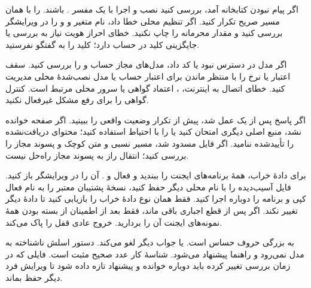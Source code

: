 اگر پیام نبودن کتابخانه آمد، بررسی کنید نصب و اجرا با یک مفسر .
 باشند. 
 را با همان مسیر صریح تکرار کنید. اگر تنظیم محلی خطا داد، نام متغیر و 
 و 
 را در ویرایشگر بررسی کنید و مقدار محرمانه را چاپ نکنید. خطای احراز هویت نیاز به بررسی یا جایگزینی کلید در حساب 
 دارد؛ کلید را به گفتگو نفرستید.

اگر مدل در دسترس نبود یا 
 کد 
 داد، مدل‌های مجاز حساب و 
 را بررسی کنید. سقف اعتبار یا نرخ را با منتظر ماندن برای اعتبار حساب یا مدل نصب‌شدهٔ محلی مدیریت کنید. خطای اتصال به اینترنت، 
، اعتماد گواهی یا سرور محلی مرتبط است. کنترل گواهی 
 را برای رفع مشکل غیرفعال نکنید.

اگر پاسخ پس از یک عمل 
 شد، پیش از تکرار وضعیت واقعی را ببینید. اگر صفحه خوانده نشد، منبع اصلی دیگری امتحان کنید یا 
 را با احتیاط استفاده کنید؛ محتوای دریافت‌نشده را تأییدشده ننامید. اگر فایل مسدود شد، مسیر نسبی و متن کوچک 
 و پسوند مجاز را بررسی کنید؛ انتقال راز به پسوند مجاز راه‌حل نیست.

برای دادهٔ خراب، همهٔ برنامه‌های ایجنت را ببندید و 
 فعال و .
 آن را در ویرایشگر باز کنید. فایل آسیب‌دیده را با نام محلی دیگر حفظ کنید، نسخهٔ پشتیبان معتبر را به نام فعال کپی و برنامه را دوباره اجرا کنید. فقط همان نوع دادهٔ خراب را بازیابی کنید تا دادهٔ دیگر تغییر نکند. اگر پس از قطع اجباری 
 باقی ماند، فقط بعد از اطمینان از بسته بودن همهٔ نمونه‌های ایجنت آن را بردارید. خروج عادی قفل را پاک می‌کند.

 به بزرگی حروف حساس است. 
 یا جواب دیگر لغو می‌کند. دستور اسلش ناشناخته به مدل نمی‌رود و راهنما پیشنهاد می‌شود. شناسهٔ کار عدد صحیح مثبت است. فایلی که در زمان بررسی تغییر کرده باید دوباره خوانده و پیشنهاد تازه داده شود تا ویرایش فرد دیگر حفظ بماند.

\cite{python-unittest}
